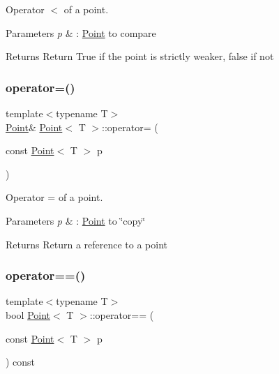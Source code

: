 Operator $<$ of a point. 


\begin{DoxyParams}{Parameters}
{\em p} & \+: \hyperlink{classPoint}{Point} to compare \\
\hline
\end{DoxyParams}
\begin{DoxyReturn}{Returns}
Return True if the point is strictly weaker, false if not 
\end{DoxyReturn}
\mbox{\label{classPoint_a42cf65d5594e882fc05a25fb344618fb}} 
\subsubsection{\texorpdfstring{operator=()}{operator=()}}
{\footnotesize\ttfamily template$<$typename T$>$ \\
\hyperlink{classPoint}{Point}\& \hyperlink{classPoint}{Point}$<$ T $>$\+::operator= (\begin{DoxyParamCaption}\item[{const \hyperlink{classPoint}{Point}$<$ T $>$}]{p }\end{DoxyParamCaption})\hspace{0.3cm}{\ttfamily [inline]}}



Operator = of a point. 


\begin{DoxyParams}{Parameters}
{\em p} & \+: \hyperlink{classPoint}{Point} to \char`\"{}copy\char`\"{} \\
\hline
\end{DoxyParams}
\begin{DoxyReturn}{Returns}
Return a reference to a point 
\end{DoxyReturn}
\mbox{\label{classPoint_a63bcffe1a385653e0dd7d3a39c06a631}} 
\subsubsection{\texorpdfstring{operator==()}{operator==()}}
{\footnotesize\ttfamily template$<$typename T$>$ \\
bool \hyperlink{classPoint}{Point}$<$ T $>$\+::operator== (\begin{DoxyParamCaption}\item[{const \hyperlink{classPoint}{Point}$<$ T $>$}]{p }\end{DoxyParamCaption}) const\hspace{0.3cm}{\ttfamily [inline]}}




